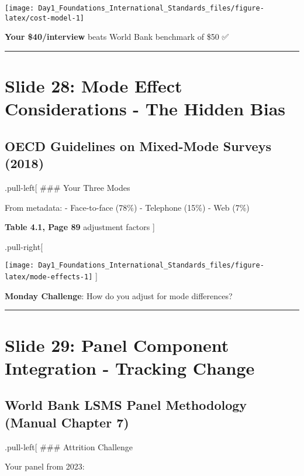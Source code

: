 \documentclass[
]{article}
\begin{document}
\texttt{[image: Day1\_Foundations\_International\_Standards\_files/figure-latex/cost-model-1]}

\textbf{Your \$40/interview} beats World Bank benchmark of \$50 ✅

\begin{center}\rule{0.5\linewidth}{0.5pt}\end{center}

\section{Slide 28: Mode Effect Considerations - The Hidden
Bias}\label{slide-28-mode-effect-considerations---the-hidden-bias}

\subsection{OECD Guidelines on Mixed-Mode Surveys
(2018)}\label{oecd-guidelines-on-mixed-mode-surveys-2018}

.pull-left{[} \#\#\# Your Three Modes

From metadata: - Face-to-face (78\%) - Telephone (15\%) - Web (7\%)

\textbf{Table 4.1, Page 89} adjustment factors {]}

.pull-right{[}

\texttt{[image: Day1\_Foundations\_International\_Standards\_files/figure-latex/mode-effects-1]}
{]}

\textbf{Monday Challenge}: How do you adjust for mode differences?

\begin{center}\rule{0.5\linewidth}{0.5pt}\end{center}

\section{Slide 29: Panel Component Integration - Tracking
Change}\label{slide-29-panel-component-integration---tracking-change}

\subsection{World Bank LSMS Panel Methodology (Manual Chapter
7)}\label{world-bank-lsms-panel-methodology-manual-chapter-7}

.pull-left{[} \#\#\# Attrition Challenge

Your panel from 2023:
\end{document}
